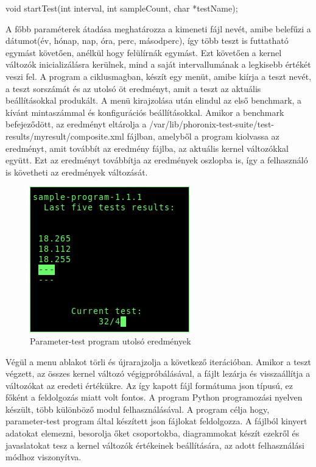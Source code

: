 \begin{cpp}
void startTest(int interval, int sampleCount, char *testName);
\end{cpp}
A főbb paraméterek átadása meghatározza a kimeneti fájl nevét, amibe belefűzi a dátumot(év, hónap, nap, óra, perc, másodperc), így több teszt is futtatható egymást követően, anélkül hogy felülírnák egymást.
Ezt követően a kernel változók inicializálásra kerülnek, mind a saját intervallumának a legkisebb értékét veszi fel. A program a ciklusmagban, készít egy menüt, amibe kiírja a teszt nevét, a teszt sorszámát és az utolsó öt eredményt, amit a teszt az aktuális beállításokkal produkált. A menü kirajzolása után elindul az első benchmark, a kívánt mintaszámmal és konfigurációs beállításokkal. Amikor a benchmark befejeződött, az eredményt eltárolja a /var/lib/phoronix-test-suite/test-results/myresult/composite.xml fájlban, amelyből a program kiolvassa az eredményt, amit továbbít az eredmény fájlba, az aktuális kernel változókkal együtt. Ezt az eredményt továbbítja az eredmények oszlopba is, így a felhasználó is követheti az eredmények változását.

\begin{figure}[h!]
\centering
\includegraphics[scale=2.0]{images/parameter-test.png}
\caption{Parameter-test program utolsó eredmények}
\label{fig:parameter-test}
\end{figure}

Végül a menu ablakot törli és újrarajzolja a következő iterációban.
Amikor a teszt végzett, az összes kernel változó végigpróbálásával, a fájlt lezárja és visszaállítja a változókat az eredeti értékükre.
Az így kapott fájl formátuma json típusú, ez főként a feldolgozás miatt volt fontos.
A program Python programozási nyelven készült, több különböző modul felhasználásával.
 A program célja hogy, parameter-test program által készített json fájlokat feldolgozza. A fájlból kinyert adatokat elemezni, besorolja őket csoportokba, diagrammokat készít ezekről és javaslatokat tesz a kernel változók értékeinek beállítására, az adott felhasználási módhoz viszonyítva.

